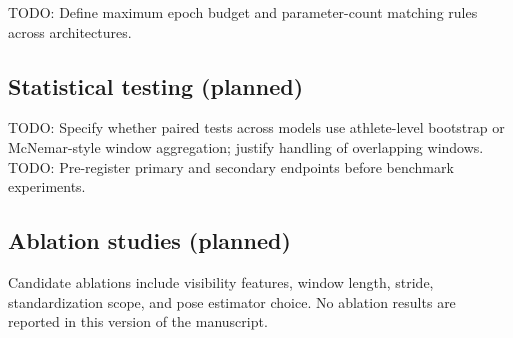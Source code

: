 \textsc{TODO:} Define maximum epoch budget and parameter-count matching rules across architectures.

\subsection{Statistical testing (planned)}
\label{sec:protocol:stats}

\textsc{TODO:} Specify whether paired tests across models use athlete-level bootstrap or McNemar-style window aggregation; justify handling of overlapping windows.
\textsc{TODO:} Pre-register primary and secondary endpoints before benchmark experiments.

\subsection{Ablation studies (planned)}
\label{sec:protocol:ablations}

Candidate ablations include visibility features, window length, stride, standardization scope, and pose estimator choice.
No ablation results are reported in this version of the manuscript.
